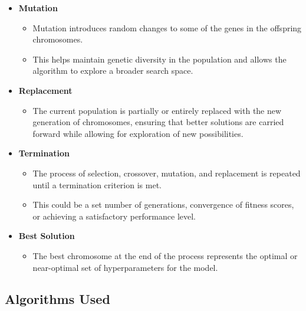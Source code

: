 \begin{itemize}
    \item \textbf{Mutation}
    \begin{itemize}
        \item Mutation introduces random changes to some of the genes in the offspring chromosomes.
        \item This helps maintain genetic diversity in the population and allows the algorithm to explore a broader search space.
    \end{itemize}

    \item \textbf{Replacement}
    \begin{itemize}
        \item The current population is partially or entirely replaced with the new generation of chromosomes, ensuring that better solutions are carried forward while allowing for exploration of new possibilities.
    \end{itemize}

    \item \textbf{Termination}
    \begin{itemize}
        \item The process of selection, crossover, mutation, and replacement is repeated until a termination criterion is met.
        \item This could be a set number of generations, convergence of fitness scores, or achieving a satisfactory performance level.
    \end{itemize}

    \item \textbf{Best Solution}
    \begin{itemize}
        \item The best chromosome at the end of the process represents the optimal or near-optimal set of hyperparameters for the model.
    \end{itemize}
\end{itemize}
\newpage

\subsection{Algorithms Used}
